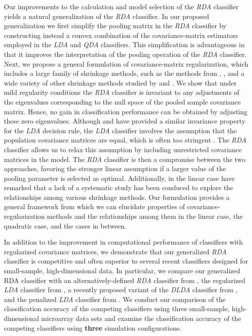 \documentclass[11pt]{article}
\begin{document}
Our improvements to the calculation and model selection of the \emph{RDA} classifier yields a natural generalization of the \emph{RDA} classifier. In our proposed generalization we first simplify the pooling matrix in the \emph{RDA} classifier by constructing instead a convex combination of the covariance-matrix estimators employed in the \emph{LDA} and \emph{QDA} classifiers. This simplification is advantageous in that it improves the interpretation of the pooling operation of the \emph{RDA} classifier. Next, we propose a general formulation of covariance-matrix regularization, which includes a large family of shrinkage methods, such as the methods from \cite{Srivastava:2007ww}, \cite{Rao:1971ul}, and a wide variety of other shrinkage methods studied by \cite{Ramey:2011ji} and \cite*{Xu:2009fl}. We show that under mild regularity conditions the \emph{RDA} classifier is invariant to any adjustments of the eigenvalues corresponding to the null space of the pooled sample covariance matrix. Hence, no gain in classification performance can be obtained by adjusting these zero eigenvalues. Although \cite{Ji:2008wp} and \cite{Ye:2006jm} have provided a similar invariance property for the \emph{LDA} decision rule, the \emph{LDA} classifier involves the assumption that the population covariance matrices are equal, which is often too stringent \citep{Clemmensen:2011kr}. The \emph{RDA} classifier allows us to relax this assumption by including unrestricted covariance matrices in the model. The \emph{RDA} classifier is then a compromise between the two approaches, favoring the stronger linear assumption if a larger value of the pooling parameter is selected as optimal. Additionally, in the linear case  \cite{Ye:2009gd} have remarked that  a lack of a systematic study has been conduced to explore the relationships among various shrinkage methods. Our formulation provides a general framework from which we can elucidate properties of covariance-regularization methods and the relationships among them in the linear case, the quadratic case, and the cases in between.

In addition to the improvement in computational performance of classifiers with regularized covariance matrices, we demonstrate that our generalized \emph{RDA} classifier is competitive and often superior to several recent classifiers designed for small-sample, high-dimensional data. In particular, we compare our generalized RDA classifier with an alternatively-defined \emph{RDA} classifier from \cite*{Hastie:2008dt}, the regularized \emph{LDA} classifier from \cite{Guo:2007te}, a recently proposed variant of the \emph{DLDA} classifier from \cite*{Tong:2012hw}, and the penalized \emph{LDA} classifier from \cite{Witten:2011kc}. We conduct our comparison of the classification accuracy of the competing classifiers using three small-sample, high-dimensional microarray data sets and examine the classification accuracy of the competing classifiers using \textbf{three} simulation configurations.
\end{document}
